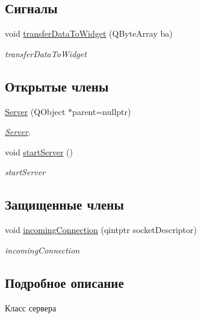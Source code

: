 \subsection*{Сигналы}
\begin{DoxyCompactItemize}
\item 
void \hyperlink{classServer_a3fddab101fd0c1b85570209fcad7155c}{transfer\+Data\+To\+Widget} (Q\+Byte\+Array ba)
\begin{DoxyCompactList}\small\item\em transfer\+Data\+To\+Widget \end{DoxyCompactList}\end{DoxyCompactItemize}
\subsection*{Открытые члены}
\begin{DoxyCompactItemize}
\item 
\hyperlink{classServer_aaf98d5194faee831c6340cc736b9b879}{Server} (Q\+Object $\ast$parent=nullptr)
\begin{DoxyCompactList}\small\item\em \hyperlink{classServer}{Server}. \end{DoxyCompactList}\item 
void \hyperlink{classServer_af59bb3a96b3311ed2b87e2d6899d9f79}{start\+Server} ()
\begin{DoxyCompactList}\small\item\em start\+Server \end{DoxyCompactList}\end{DoxyCompactItemize}
\subsection*{Защищенные члены}
\begin{DoxyCompactItemize}
\item 
void \hyperlink{classServer_a3952d37b7bc53a4377f411d9ccaa9d62}{incoming\+Connection} (qintptr socket\+Descriptor)
\begin{DoxyCompactList}\small\item\em incoming\+Connection \end{DoxyCompactList}\end{DoxyCompactItemize}


\subsection{Подробное описание}
Класс сервера 

